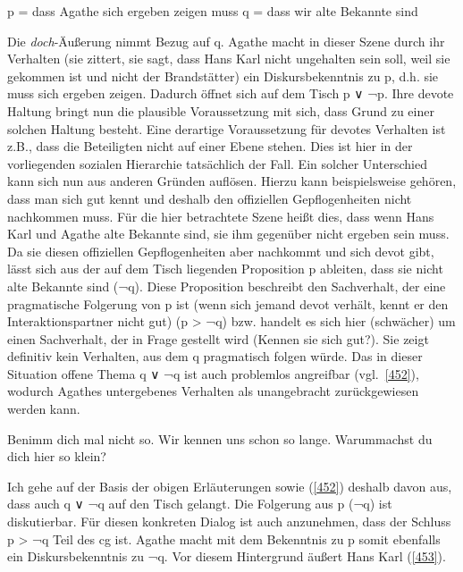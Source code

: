 \begin{exe}
	\ex\label{451} 
	\begin{xlist}
		\ex\label{451a} p = dass Agathe sich ergeben zeigen muss
 		\ex\label{451b}	q = dass wir alte Bekannte sind	
 	\end{xlist}	
\end{exe}		
Die \textit{doch}-Äußerung nimmt Bezug auf q. Agathe macht in dieser Szene durch ihr Verhalten (sie zittert, sie sagt, dass Hans Karl nicht ungehalten sein soll, weil sie gekommen ist und nicht der Brandstätter) ein Diskursbekenntnis zu p, d.h. sie muss sich ergeben zeigen. Dadurch öffnet sich auf dem Tisch p ∨ ¬p. Ihre devote Haltung bringt nun die plausible Voraussetzung mit sich, dass Grund zu einer solchen Haltung besteht. Eine derartige Voraussetzung für devotes Verhalten ist z.B., dass die Beteiligten nicht auf einer Ebene stehen. Dies ist hier in der vorliegenden sozialen Hierarchie tatsächlich der Fall. Ein solcher Unterschied kann sich nun aus anderen Gründen auflösen. Hierzu kann beispielsweise gehören, dass man sich gut kennt und deshalb den offiziellen Gepflogenheiten nicht nachkommen muss. Für die hier betrachtete Szene heißt dies, dass wenn Hans Karl und Agathe alte Bekannte sind, sie ihm gegenüber nicht ergeben sein muss. Da sie diesen offiziellen Gepflogenheiten aber nachkommt und sich devot gibt, lässt sich aus der auf dem Tisch liegenden Proposition p ableiten, dass sie nicht alte Bekannte sind (¬q). Diese Proposition beschreibt den Sachverhalt, der eine pragmatische Folgerung von p ist (wenn sich jemand devot verhält, kennt er den Interaktionspartner nicht gut) (p > ¬q) bzw. handelt es sich hier (schwächer) um einen Sachverhalt, der in Frage gestellt wird (Kennen sie sich gut?). Sie zeigt definitiv kein Verhalten, aus dem q pragmatisch folgen würde. Das in dieser Situation offene Thema q ∨ ¬q ist auch problemlos angreifbar (vgl.\ \ref{452}), wodurch Agathes untergebenes Verhalten als unangebracht zurückgewiesen werden kann.

\begin{exe}
	\ex\label{452} 
	Benimm dich mal nicht so. Wir kennen uns schon so lange. Warum\linebreak machst du dich hier so klein?
\end{exe}
Ich gehe auf der Basis der obigen Erläuterungen sowie (\ref{452}) deshalb davon aus, dass auch q ∨ ¬q auf den Tisch gelangt. Die Folgerung aus p (¬q) ist diskutierbar. Für diesen konkreten Dialog ist auch anzunehmen, dass der Schluss p > ¬q Teil des cg ist. Agathe macht mit dem Bekenntnis zu p somit ebenfalls ein Diskursbekenntnis zu ¬q. Vor diesem Hintergrund äußert Hans Karl (\ref{453}).

